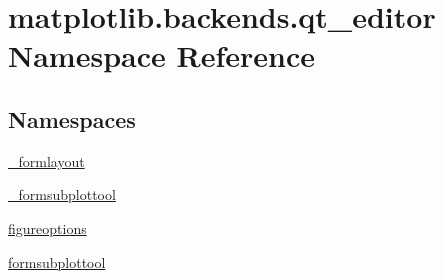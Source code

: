 \hypertarget{namespacematplotlib_1_1backends_1_1qt__editor}{}\section{matplotlib.\+backends.\+qt\+\_\+editor Namespace Reference}
\label{namespacematplotlib_1_1backends_1_1qt__editor}
\subsection*{Namespaces}
\begin{DoxyCompactItemize}
\item 
 \hyperlink{namespacematplotlib_1_1backends_1_1qt__editor_1_1__formlayout}{\+\_\+formlayout}
\item 
 \hyperlink{namespacematplotlib_1_1backends_1_1qt__editor_1_1__formsubplottool}{\+\_\+formsubplottool}
\item 
 \hyperlink{namespacematplotlib_1_1backends_1_1qt__editor_1_1figureoptions}{figureoptions}
\item 
 \hyperlink{namespacematplotlib_1_1backends_1_1qt__editor_1_1formsubplottool}{formsubplottool}
\end{DoxyCompactItemize}
